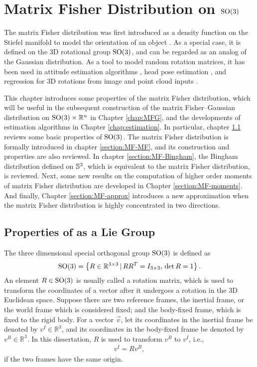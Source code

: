 
\chapter{Matrix Fisher Distribution on $\mathrm{SO}(3)$} \label{chap:MF}

The matrix Fisher distribution was first introduced as a density function on the Stiefel manifold to model the orientation of an object \cite{downs1972orientation}.
As a special case, it is defined on the 3D rotational group $\mathrm{SO}(3)$, and can be regarded as an analog of the Gaussian distribution.
As a tool to model random rotation matrices, it has been used in attitude estimation algorithms \cite{lee2018bayesian}, head pose estimation \cite{liu2021mfdnet}, and regression for 3D rotations from image and point cloud inputs \cite{mohlin2020probabilistic,yin2022fishermatch}.

This chapter introduces some properties of the matrix Fisher distribution, which will be useful in the subsequent construction of the matrix Fisher--Gaussian distribution on $\mathrm{SO}(3)\times \mathbb{R}^n$ in Chapter \ref{chap:MFG}, and the developments of estimation algorithms in Chapter \ref{chap:estimation}.
In particular, chapter \ref{section:MF-SO(3)} reviews some basic properties of $\mathrm{SO}(3)$.
The matrix Fisher distribution is formally introduced in chapter \ref{section:MF-MF}, and its construction and properties are also reviewed.
In chapter \ref{section:MF-Bingham}, the Bingham distribution defined on $\mathbb{S}^3$, which is equivalent to the matrix Fisher distribution, is reviewed.
Next, some new results on the computation of higher order moments of matrix Fisher distribution are developed in Chapter \ref{section:MF-moments}.
And finally, Chapter \ref{section:MF-approx} introduces a new approximation when the matrix Fisher distribution is highly concentrated in two directions.

\section{Properties of  as a Lie Group} \label{section:MF-SO(3)}

The three dimensional special orthogonal group $\mathrm{SO}(3)$ is defined as
\begin{align}
	\mathrm{SO}(3) = \left\{ R\in\mathbb{R}^{3\times 3} \,|\, RR^T = I_{3\times 3},\, \det R = 1 \right\}.
\end{align}
An element $R\in\mathrm{SO}(3)$ is usually called a rotation matrix, which is used to transform the coordinates of a vector after it undergoes a rotation in the 3D Euclidean space.
Suppose there are two reference frames, the inertial frame, or the world frame which is considered fixed; and the body-fixed frame, which is fixed to the rigid body.
For a vector $\vec{v}$, let its coordinates in the inertial frame be denoted by $v^I \in \mathbb{R}^3$, and its coordinates in the body-fixed frame be denoted by $v^B \in \mathbb{R}^3$.
In this dissertation, $R$ is used to transform $v^B$ to $v^I$, i.e.,
\begin{align}
	v^I = Rv^B,
\end{align}
if the two frames have the same origin.

